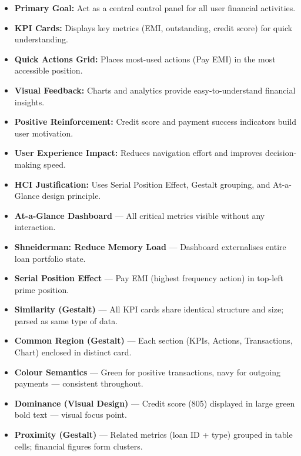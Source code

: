 \documentclass[11pt,a4paper]{article}
\newcommand{\ptag}[1]{\colorbox{tagbg}{\textcolor{tagtxt}{\textbf{\small #1}}}}
\begin{document}
\begin{itemize}[leftmargin=1.5em,itemsep=4pt]

\item \textbf{Primary Goal:}
Act as a central control panel for all user financial activities.

\item \textbf{KPI Cards:}
Displays key metrics (EMI, outstanding, credit score) for quick understanding.

\item \textbf{Quick Actions Grid:}
Places most-used actions (Pay EMI) in the most accessible position.

\item \textbf{Visual Feedback:}
Charts and analytics provide easy-to-understand financial insights.

\item \textbf{Positive Reinforcement:}
Credit score and payment success indicators build user motivation.

\item \textbf{User Experience Impact:}
Reduces navigation effort and improves decision-making speed.

\item \textbf{HCI Justification:}
Uses Serial Position Effect, Gestalt grouping, and At-a-Glance design principle.

\end{itemize}

\begin{hcimap}
\begin{itemize}[leftmargin=1.2em,itemsep=2pt]
  \item \ptag{At-a-Glance Dashboard} --- All critical metrics visible without any interaction.
  \item \ptag{Shneiderman: Reduce Memory Load} --- Dashboard externalises entire loan portfolio state.
  \item \ptag{Serial Position Effect} --- Pay EMI (highest frequency action) in top-left prime position.
  \item \ptag{Similarity (Gestalt)} --- All KPI cards share identical structure and size; parsed as same type of data.
  \item \ptag{Common Region (Gestalt)} --- Each section (KPIs, Actions, Transactions, Chart) enclosed in distinct card.
  \item \ptag{Colour Semantics} --- Green for positive transactions, navy for outgoing payments --- consistent throughout.
  \item \ptag{Dominance (Visual Design)} --- Credit score (805) displayed in large green bold text --- visual focus point.
  \item \ptag{Proximity (Gestalt)} --- Related metrics (loan ID + type) grouped in table cells; financial figures form clusters.
\end{itemize}
\end{hcimap}
\end{document}
